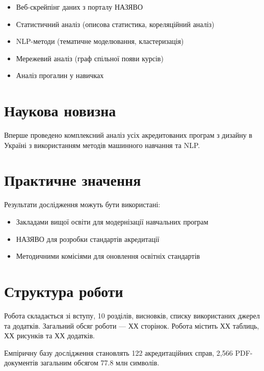 \begin{itemize}
    \item Веб-скрейпінг даних з порталу НАЗЯВО
    \item Статистичний аналіз (описова статистика, кореляційний аналіз)
    \item NLP-методи (тематичне моделювання, кластеризація)
    \item Мережевий аналіз (граф спільної появи курсів)
    \item Аналіз прогалин у навичках
\end{itemize}

\section{Наукова новизна}

Вперше проведено комплексний аналіз усіх акредитованих програм з дизайну
в Україні з використанням методів машинного навчання та NLP.

\section{Практичне значення}

Результати дослідження можуть бути використані:
\begin{itemize}
    \item Закладами вищої освіти для модернізації навчальних програм
    \item НАЗЯВО для розробки стандартів акредитації
    \item Методичними комісіями для оновлення освітніх стандартів
\end{itemize}

\section{Структура роботи}

Робота складається зі вступу, 10 розділів, висновків, списку використаних
джерел та додатків. Загальний обсяг роботи --- ХХ сторінок.
Робота містить ХХ таблиць, ХХ рисунків та ХХ додатків.

Емпіричну базу дослідження становлять 122 акредитаційних справ,
2,566 PDF-документів загальним обсягом 77.8 млн символів.
